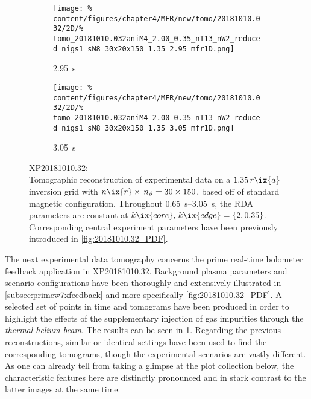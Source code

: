 \begin{figure}[t]
\begin{subfigure}{0.45\textwidth}
                    \caption{\SI{2.95}{\second}}%
                    \texttt{[image: \%
                        content/figures/chapter4/MFR/new/tomo/20181010.032/2D/\%
                        tomo\_20181010.032aniM4\_2.00\_0.35\_nT13\_nW2\_reduced\_nigs1\_sN8\_30x20x150\_1.35\_2.95\_mfr1D.png]}%
                    \end{subfigure}%
                \hfill%
                \begin{subfigure}{0.45\textwidth}%
                    \centering%
                    \caption{\SI{3.05}{\second}}%
                    \texttt{[image: \%
                        content/figures/chapter4/MFR/new/tomo/20181010.032/2D/\%
                        tomo\_20181010.032aniM4\_2.00\_0.35\_nT13\_nW2\_reduced\_nigs1\_sN8\_30x20x150\_1.35\_3.05\_mfr1D.png]}%
                \end{subfigure}%
                \caption{%
                    XP20181010.32:\\%
                    Tomographic reconstruction of experimental data on a $1.35\,r\ix{a}$ inversion grid with $n\ix{r}\times\,n_{\vartheta}=30\times150$, based off of standard magnetic configuration. Throughout \SIrange{0.65}{3.05}{\second}, the RDA parameters are constant at $k\ix{core},\,k\ix{edge}=\left\{2, 0.35\right\}$. Corresponding central experiment parameters have been previously introduced in \cref{fig:20181010.32_PDF}.}\label{fig:tomo_20181010.32_times}%
            \end{figure}%
%
            The next experimental data tomography concerns the prime real-time bolometer feedback application in XP20181010.32. Background plasma parameters and scenario configurations have been thoroughly and extensively illustrated in \cref{subsec:primew7xfeedback} and more specifically \cref{fig:20181010.32_PDF}. A selected set of points in time and tomograms have been produced in order to highlight the effects of the supplementary injection of gas impurities through the \textit{thermal helium beam}. The results can be seen in \cref{fig:tomo_20181010.32_times}. Regarding the previous reconstructions, similar or identical settings have been used to find the corresponding tomograms, though the experimental scenarios are vastly different. As one can already tell from taking a glimpse at the plot collection below, the characteristic features here are distinctly pronounced and in stark contrast to the latter images at the same time.\\%
